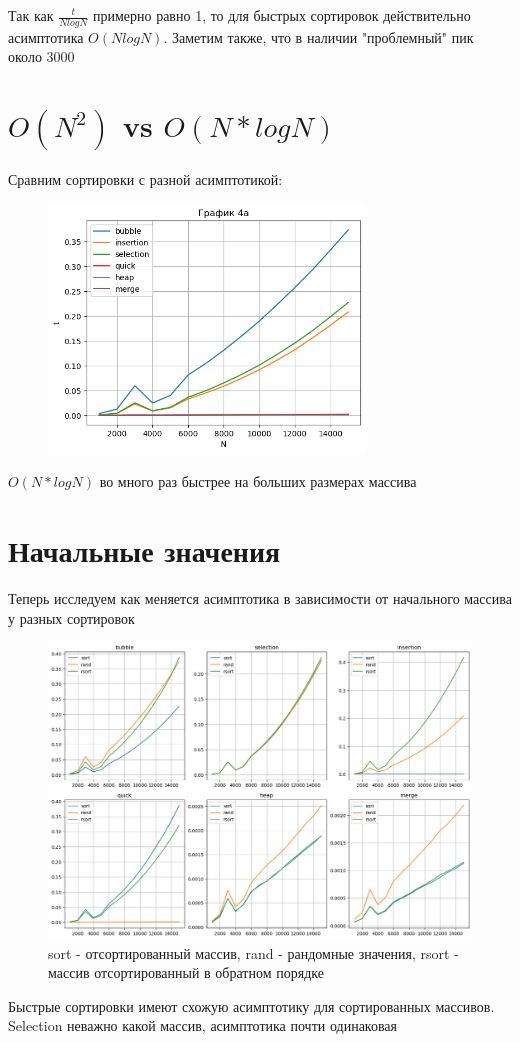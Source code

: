 \documentclass[12pt,onecolumn]{article}
\begin{document}
Так как $\frac{t}{NlogN}$ примерно равно 1, то для быстрых сортировок действительно асимптотика $O(NlogN)$.
Заметим также, что в наличии "проблемный" пик около 3000
\section{$O(N^2)$ vs $O(N*logN)$}

Сравним сортировки с разной асимптотикой:
\begin{figure}[H]
    \centering
    \includegraphics[width=0.75\textwidth]{Assets/graph4a.png}
\end{figure}

$O(N*logN)$ во много раз быстрее на больших размерах массива
\section{Начальные значения}
Теперь исследуем как меняется асимптотика в зависимости от начального массива у разных сортировок
\begin{figure}[H]
    \centering
    \includegraphics[width=1.1\textwidth]{Assets/graph5.png}
    \caption{sort - отсортированный массив, rand - рандомные значения, rsort - массив отсортированный в обратном порядке}
\end{figure}
Быстрые сортировки имеют схожую асимптотику для сортированных массивов. Selection неважно какой массив, асимптотика почти одинаковая
\end{document}
